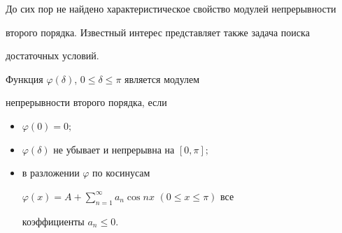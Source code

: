  


До сих пор не найдено характеристическое свойство модулей непрерывности 


второго порядка. Известный интерес представляет также задача поиска 


достаточных условий. 


 


\begin{thm} 


Функция $\varphi(\delta)$, $0\le\delta\le\pi$ является модулем 


непрерывности второго порядка, если 


\begin{itemize} 


\item[(a)] $\varphi(0)=0;$ 


\item[(б)] $\varphi(\delta)$ не убывает и непрерывна на $[0,\pi];$ 


\item[(в)] в разложении $\varphi$ по косинусам 


$\varphi(x)=A+\sum\limits^\infty_{n=1}a_n\cos nx$ $(0\le x\le\pi)$ все 


коэффициенты $a_n\le 0$. 


\end{itemize} 


\end{thm} 


 


